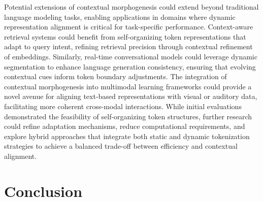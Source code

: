 \documentclass{article}
\begin{document}
Potential extensions of contextual morphogenesis could extend beyond traditional language modeling tasks, enabling applications in domains where dynamic representation alignment is critical for task-specific performance. Context-aware retrieval systems could benefit from self-organizing token representations that adapt to query intent, refining retrieval precision through contextual refinement of embeddings. Similarly, real-time conversational models could leverage dynamic segmentation to enhance language generation consistency, ensuring that evolving contextual cues inform token boundary adjustments. The integration of contextual morphogenesis into multimodal learning frameworks could provide a novel avenue for aligning text-based representations with visual or auditory data, facilitating more coherent cross-modal interactions. While initial evaluations demonstrated the feasibility of self-organizing token structures, further research could refine adaptation mechanisms, reduce computational requirements, and explore hybrid approaches that integrate both static and dynamic tokenization strategies to achieve a balanced trade-off between efficiency and contextual alignment.



\section{Conclusion}
\end{document}
